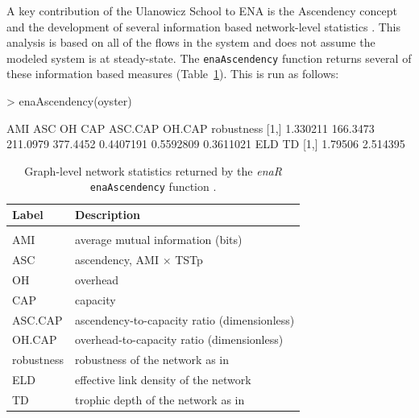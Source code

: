 \documentclass[article]{jss}
\begin{document}
A key contribution of the Ulanowicz School to ENA is the Ascendency
concept and the development of several information based network-level
statistics \citep{ulanowicz86, ulanowicz97}.  This analysis is based
on all of the flows in the system and does not assume the modeled
system is at steady-state.  The \texttt{enaAscendency} function
returns several of these information based measures
(Table~\ref{tab:asc}).  This is run as follows:

\begin{Schunk}
\begin{Sinput}
>   enaAscendency(oyster)
\end{Sinput}
\begin{Soutput}
          AMI      ASC       OH      CAP   ASC.CAP    OH.CAP robustness
[1,] 1.330211 166.3473 211.0979 377.4452 0.4407191 0.5592809  0.3611021
         ELD       TD
[1,] 1.79506 2.514395
\end{Soutput}
\end{Schunk}

\begin{table}[t]
  \caption{Graph-level network statistics returned by the \textit{enaR}
    \texttt{enaAscendency} function \citep[see][for
    interpretations]{ulanowicz86, ulanowicz97}.}\label{tab:asc}
  \center
  \begin{small}
    \begin{tabular}{l l}
      \textbf{Label} & \textbf{Description} \\ \hline \\[-1.5ex]
      AMI & average mutual information (bits) \\
      ASC & ascendency, AMI $\times$ TSTp \\
      OH & overhead \\
      CAP& capacity \\
      ASC.CAP& ascendency-to-capacity ratio (dimensionless)\\
      OH.CAP& overhead-to-capacity ratio (dimensionless)\\
      robustness & robustness of the network as in \citet{fath2014quantifying} \\
      ELD & effective link density of the network \citet{ulanowicz2014}\\
      TD & trophic depth of the network as in \citet{ulanowicz2014} \\
      \hline
    \end{tabular}
  \end{small}
\end{table}
\end{document}

